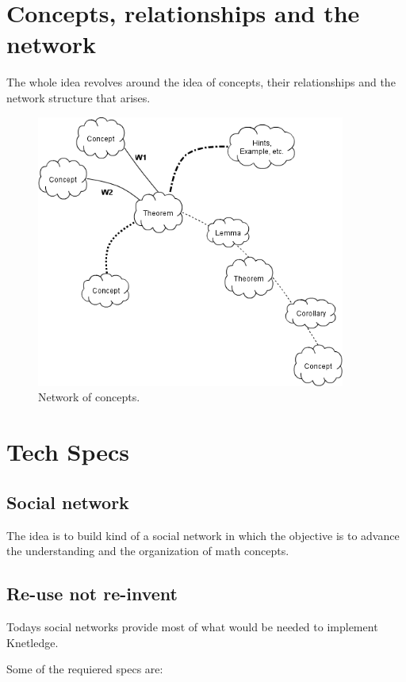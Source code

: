 \section{Concepts, relationships and the network}
The whole idea revolves around the idea of concepts, 
their relationships and the network structure 
that arises.

\begin{figure}[ht]
 \begin{center}
    \includegraphics[width=4in]{../img/knet_general.png}
 \end{center}
    \caption{Network of concepts.}
    \label{fig:network_concepts}
\end{figure}



\section{Tech Specs}

\subsection{Social network}
The idea is to build kind of a social network in which
the objective is to advance the understanding and the
organization of math concepts.

\subsection{Re-use not re-invent}
Todays social networks provide most of what would be
needed to implement Knetledge.

Some of the requiered specs are:

